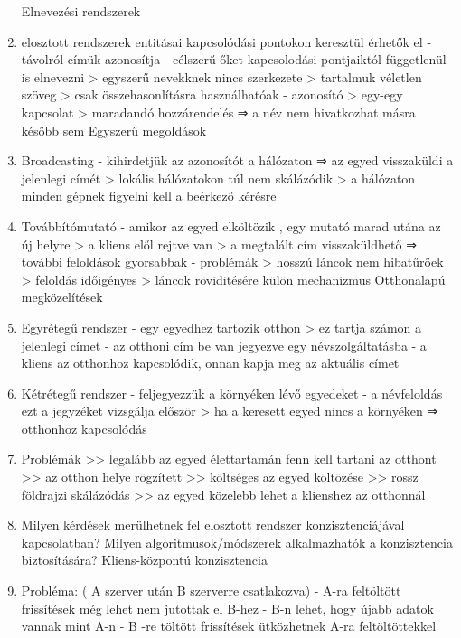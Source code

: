 \documentclass[twoside, a4paper, 12pt]{article}
\begin{document}
\begin{enumerate}
        Elnevezési rendszerek
    \item elosztott rendszerek entitásai kapcsolódási pontokon keresztül érhetők el
        - távolról címük azonosítja
        - célszerű őket kapcsolodási pontjaiktól függetlenül is elnevezni
        > egyszerű nevekknek nincs szerkezete
        > tartalmuk véletlen szöveg
        > csak összehasonlításra használhatóak
        - azonosító
        > egy-egy kapcsolat
        > maradandó hozzárendelés
        ⇒ a név nem hivatkozhat másra később sem
        Egyszerű megoldások 
    \item Broadcasting
        - kihirdetjük az azonosítót a hálózaton ⇒ az egyed visszaküldi a jelenlegi címét
        > lokális hálózatokon túl nem skálázódik
        > a hálózaton minden gépnek figyelni kell a beérkező kérésre 
    \item Továbbítómutató
        - amikor az egyed elköltözik , egy mutató marad utána az új helyre
        > a kliens elől rejtve van
        > a megtalált cím visszaküldhető ⇒ további feloldások gyorsabbak
        - problémák
        > hosszú láncok nem hibatűrőek
        > feloldás időigényes
        > láncok röviditésére külön mechanizmus
        Otthonalapú megközelítések
    \item Egyrétegű rendszer
        - egy egyedhez tartozik otthon
        > ez tartja számon a jelenlegi címet
        - az otthoni cím be van jegyezve egy névszolgáltatásba
        - a kliens az otthonhoz kapcsolódik, onnan kapja meg az aktuális címet
    \item Kétrétegű rendszer
        - feljegyezzük a környéken lévő egyedeket
        - a névfeloldás ezt a jegyzéket vizsgálja először
        > ha a keresett egyed nincs a környéken ⇒ otthonhoz kapcsolódás
    \item Problémák
        >> legalább az egyed élettartamán fenn kell tartani az otthont
        >> az otthon helye rögzített >> költséges az egyed költözése
        >> rossz földrajzi skálázódás
        >> az egyed közelebb lehet a klienshez az otthonnál
    \item  Milyen kérdések merülhetnek fel elosztott rendszer konzisztenciájával kapcsolatban? Milyen algoritmusok/módszerek alkalmazhatók a konzisztencia biztosítására? 
        Kliens-központú konzisztencia
    \item Probléma: ( A szerver után B szerverre csatlakozva)
        - A-ra feltöltött frissítések még lehet nem jutottak el B-hez
        - B-n lehet, hogy újabb adatok vannak mint A-n
        - B -re töltött frissítések ütközhetnek A-ra feltöltöttekkel

\end{enumerate}
\end{document}
